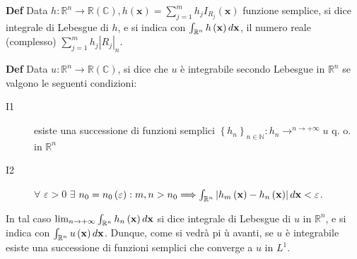\documentclass{article}
\begin{document}
\textbf{Def} Data $h:%
\mathbb{R}
^{n}\rightarrow 
\mathbb{R}
\left( 
\mathbb{C}
\right) ,h\left( \mathbf{x}\right) =\sum_{j=1}^{m}h_{j}I_{R_{j}}\left( 
\mathbf{x}\right) $ funzione semplice, si dice integrale di Lebesgue di $h$,
e si indica con $\int_{%
\mathbb{R}
^{n}}h\left( \mathbf{x}\right) d\mathbf{x}$, il numero reale (complesso) $%
\sum_{j=1}^{m}h_{j}\left\vert R_{j}\right\vert _{n}$.

\textbf{Def} Data $u:%
\mathbb{R}
^{n}\rightarrow 
\mathbb{R}
\left( 
\mathbb{C}
\right) $, si dice che $u$ \`{e} integrabile secondo Lebesgue in $%
\mathbb{R}
^{n}$ se valgono le seguenti condizioni:

\begin{description}
\item[I1] esiste una successione di funzioni semplici $\left\{ h_{n}\right\}
_{n\in 
\mathbb{N}
}:h_{n}\rightarrow ^{n\rightarrow +\infty }u$ q. o. in $%
\mathbb{R}
^{n}$

\item[I2] $\forall $ $\varepsilon >0$ $\exists $ $n_{0}=n_{0}\left(
\varepsilon \right) :m,n>n_{0}\Longrightarrow \int_{%
\mathbb{R}
^{n}}\left\vert h_{m}\left( \mathbf{x}\right) -h_{n}\left( \mathbf{x}\right)
\right\vert d\mathbf{x}<\varepsilon $.
\end{description}

In tal caso $\lim_{n\rightarrow +\infty }\int_{%
\mathbb{R}
^{n}}h_{n}\left( \mathbf{x}\right) d\mathbf{x}$ si dice integrale di
Lebesgue di $u$ in $%
\mathbb{R}
^{n}$, e si indica con $\int_{%
\mathbb{R}
^{n}}u\left( \mathbf{x}\right) d\mathbf{x}$. Dunque, come si vedr\`{a} pi%
\`{u} avanti, se $u$ \`{e} integrabile esiste una successione di funzioni
semplici che converge a $u$ in $L^{1}$.
\end{document}
